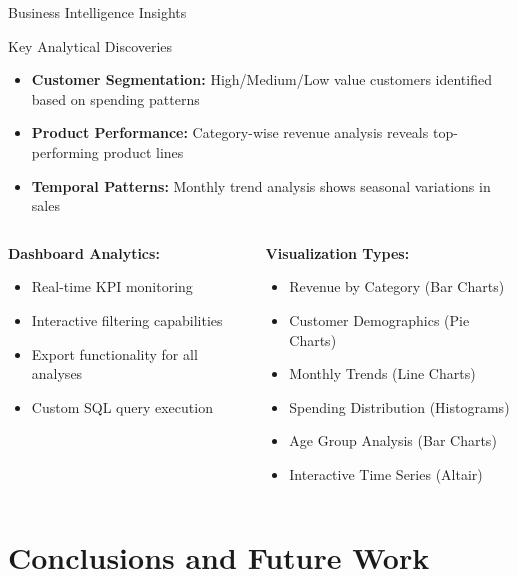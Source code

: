 \documentclass[aspectratio=169]{beamer}
\begin{document}
\begin{frame}{Business Intelligence Insights}
\begin{block}{Key Analytical Discoveries}
\begin{itemize}
    \item \textbf{Customer Segmentation:} High/Medium/Low value customers identified based on spending patterns
    \item \textbf{Product Performance:} Category-wise revenue analysis reveals top-performing product lines
    \item \textbf{Temporal Patterns:} Monthly trend analysis shows seasonal variations in sales
\end{itemize}
\end{block}

\vspace{0.5cm}

\begin{columns}
\begin{column}{0.5\textwidth}
\textbf{Dashboard Analytics:}
\begin{itemize}
    \item Real-time KPI monitoring
    \item Interactive filtering capabilities
    \item Export functionality for all analyses
    \item Custom SQL query execution
\end{itemize}
\end{column}
\begin{column}{0.5\textwidth}
\textbf{Visualization Types:}
\begin{itemize}
    \item Revenue by Category (Bar Charts)
    \item Customer Demographics (Pie Charts)
    \item Monthly Trends (Line Charts)
    \item Spending Distribution (Histograms)
    \item Age Group Analysis (Bar Charts)
    \item Interactive Time Series (Altair)
\end{itemize}
\end{column}
\end{columns}
\end{frame}

\section{Conclusions and Future Work}
\end{document}
